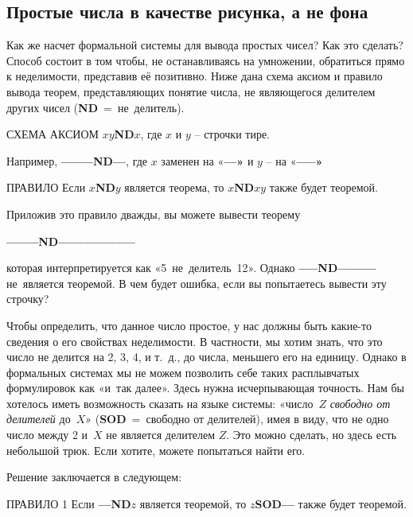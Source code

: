 \documentclass[../main.tex]{subfiles}
\begin{document}
\subsection{Простые числа в качестве рисунка, а не фона}

Как же насчет формальной системы для вывода простых чисел?
Как это сделать?
Способ состоит в том чтобы, не останавливаясь на умножении, обратиться прямо к неделимости, представив её позитивно.
Ниже дана схема аксиом и правило вывода теорем, представляющих понятие числа, не являющегося делителем других чисел (\textbf{ND}~=~не~делитель).

\begin{mybox}{СХЕМА АКСИОМ}
    \textbf{$xy$ND$x$}, где $x$ и $y$ \--- строчки тире.
\end{mybox}

Например, \textbf{--{}--{}--{}--{}--ND--{}--}, где $x$ заменен на «\textbf{--{}--»} и $y$ \--- на «\textbf{--{}--{}--»}

\begin{mybox}{ПРАВИЛО}
    Если \textbf{$x$ND$y$} является теорема, то \textbf{$x$ND$xy$} также будет теоремой.
\end{mybox}

Приложив это правило дважды, вы можете вывести теорему
%
\begin{center}
    \textbf{--{}--{}--{}--{}--ND--{}--{}--{}--{}--{}--{}--{}--{}--{}--{}--{}--}
\end{center}
%
которая интерпретируется как «5~не~делитель~12».
Однако \textbf{--{}--{}--ND--{}--{}--{}--{}--{}--} не~является теоремой.
В чем будет ошибка, если вы попытаетесь вывести эту строчку?

Чтобы определить, что данное число простое, у нас должны быть какие-то сведения о его свойствах неделимости.
В частности, мы хотим знать, что это число не делится на 2, 3, 4, и т.~д., до числа, меньшего его на единицу.
Однако в формальных системах мы не можем позволить себе таких расплывчатых формулировок как «и~так далее».
Здесь нужна исчерпывающая точность.
Нам бы хотелось иметь возможность сказать на языке системы: «число~$Z$ \emph{свободно от делителей} до~$X$» (\textbf{SOD}~=~свободно от делителей), имея в виду, что не одно число между 2 и~$X$ не является делителем $Z$.
Это можно сделать, но здесь есть небольшой трюк.
Если хотите, можете попытаться найти его.

Решение заключается в следующем:

\begin{mybox}{ПРАВИЛО 1}
    Если \textbf{--{}--ND$z$} является теоремой, то \textbf{$z$SOD--{}--} также будет теоремой.
\end{mybox}
\end{document}
